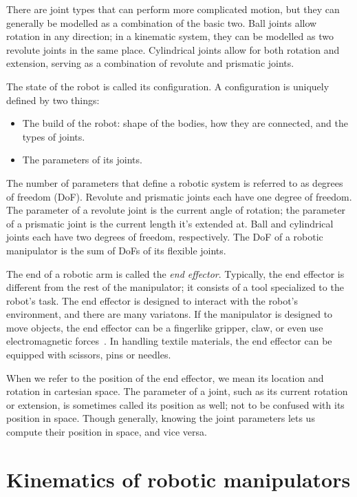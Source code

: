 There are joint types that can perform more complicated motion, but they can generally be modelled as a combination of the basic two. Ball joints allow rotation in any direction; in a kinematic system, they can be modelled as two revolute joints in the same place. Cylindrical joints allow for both rotation and extension, serving as a combination of revolute and prismatic joints.

The state of the robot is called its configuration. A configuration is uniquely defined by two things:
\begin{itemize}
  \item The build of the robot: shape of the bodies, how they are connected, and the types of joints.
  \item The parameters of its joints.
\end{itemize}

The number of parameters that define a robotic system is referred to as degrees of freedom (DoF). Revolute and prismatic joints each have one degree of freedom. The parameter of a revolute joint is the current angle of rotation; the parameter of a prismatic joint is the current length it's extended at. Ball and cylindrical joints each have two degrees of freedom, respectively. The DoF of a robotic manipulator is the sum of DoFs of its flexible joints.

The end of a robotic arm is called the \textit{end effector}. Typically, the end effector is different from the rest of the manipulator; it consists of a tool specialized to the robot's task. The end effector is designed to interact with the robot's environment, and there are many variatons. If the manipulator is designed to move objects, the end effector can be a fingerlike gripper, claw, or even use electromagnetic forces~\cite{grippers}. In handling textile materials, the end effector can be equipped with scissors, pins or needles.

When we refer to the position of the end effector, we mean its location and rotation in cartesian space. The parameter of a joint, such as its current rotation or extension, is sometimes called its position as well; not to be confused with its position in space. Though  generally, knowing the joint parameters lets us compute their position in space, and vice versa.

\section{Kinematics of robotic manipulators}

